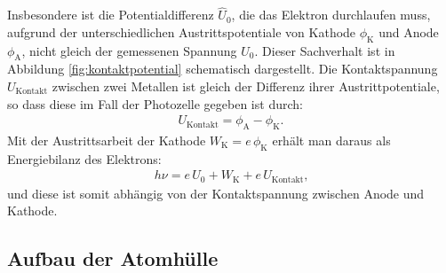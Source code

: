 \documentclass[11pt, a4paper]{article}
\numberwithin{equation}{section}
\begin{document}
Insbesondere ist die Potentialdifferenz $\hat{U}_0$, die das Elektron durchlaufen muss, aufgrund der unterschiedlichen Austrittspotentiale von Kathode $\phi_\mathrm{K}$ und Anode $\phi_\mathrm{A}$, nicht gleich der gemessenen Spannung $U_0$.
Dieser Sachverhalt ist in Abbildung \ref{fig:kontaktpotential} schematisch dargestellt.
Die Kontaktspannung $U_\mathrm{Kontakt}$ zwischen zwei Metallen ist gleich der Differenz ihrer Austrittpotentiale, so dass diese im Fall der Photozelle gegeben ist durch:
\begin{align*}
	U_\mathrm{Kontakt} = \phi_\mathrm{A} - \phi_\mathrm{K}\text{.}
\end{align*}
Mit der Austrittsarbeit der Kathode $W_\mathrm{K} = e \, \phi_\mathrm{K}$ erhält man daraus als Energiebilanz des Elektrons:
\begin{align}
\label{eq:energiebilanz}
	h \nu = e \, U_0 + W_\mathrm{K} + e \, U_\mathrm{Kontakt} \text{,}
\end{align}
und diese ist somit abhängig von der Kontaktspannung zwischen Anode und Kathode.

\subsection{Aufbau der Atomhülle}
\end{document}
